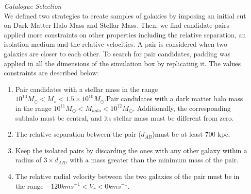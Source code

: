 \documentclass[fleqn,usenatbib]{mnras}
\begin{document}
\textit{Catalogue Selection}\\
We defined two strategies to create samples of galaxies by imposing an
initial cut on Dark Matter Halo Mass and Stellar Mass. %
Then, we find candidate pairs applied more constraints on other
properties including the relative separation, an isolation medium and
the relative velocities. A pair is considered when two galaxies are
closer to each other. To search for pair candidates, padding was
applied in all the dimensions of the simulation box by replicating
it. The values constraints are described below: 
\begin{enumerate}[i]
  \item Pair candidates with a stellar mass in the range $10^{10}M_\odot <M_\star<1.5\times 10^{10}M_\odot$.Pair candidates with a dark matter halo mass in the range $10^{11}M_\odot<M_{halo}<10^{12}M_\odot$. Additionally, the corresponding subhalo must be central, and its stellar mass must be different from zero. 
  \item The relative separation between the pair ($d_{AB}$)must be at least $700$ kpc. 
  \item Keep the isolated pairs by discarding the ones with any other galaxy within a radius of $3\times d_{AB}$, with a mass greater than the minimum mass of the pair. 
  \item The relative radial velocity between the two galaxies of the pair must be in the range $-120 km s^{-1}<V_r<0 km s^{-1}$. 
\end{enumerate}
\end{document}
